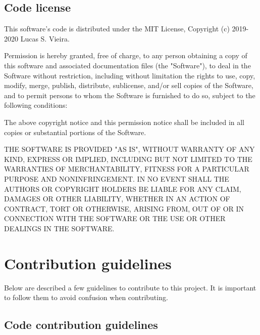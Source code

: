 \documentclass[openright,a4paper,twoside,12pt]{memoir}
\begin{document}
\subsection{Code license}
\label{sec:orgf3360fe}

This software's code is distributed under the MIT License, Copyright
(c) 2019-2020 Lucas S. Vieira.

Permission is hereby granted, free of charge, to any person obtaining
a copy of this software and associated documentation files (the
"Software"), to deal in the Software without restriction, including
without limitation the rights to use, copy, modify, merge, publish,
distribute, sublicense, and/or sell copies of the Software, and to
permit persons to whom the Software is furnished to do so, subject
to the following conditions:

The above copyright notice and this permission notice shall be
included in all copies or substantial portions of the Software.

THE SOFTWARE IS PROVIDED "AS IS", WITHOUT WARRANTY OF ANY KIND,
EXPRESS OR IMPLIED, INCLUDING BUT NOT LIMITED TO THE WARRANTIES OF
MERCHANTABILITY, FITNESS FOR A PARTICULAR PURPOSE AND
NONINFRINGEMENT. IN NO EVENT SHALL THE AUTHORS OR COPYRIGHT HOLDERS
BE LIABLE FOR ANY CLAIM, DAMAGES OR OTHER LIABILITY, WHETHER IN AN
ACTION OF CONTRACT, TORT OR OTHERWISE, ARISING FROM, OUT OF OR IN
CONNECTION WITH THE SOFTWARE OR THE USE OR OTHER DEALINGS IN THE
SOFTWARE.

\section{Contribution guidelines}
\label{sec:org2f6f043}

Below are described a few guidelines to contribute to this project. It
is important to follow them to avoid confusion when contributing.

\subsection{Code contribution guidelines}
\label{sec:org69ed594}
\end{document}
